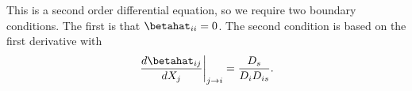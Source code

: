  This is a second order differential equation, so we require two boundary conditions. The first is that $\betahat_ {i i} = 0$. The second condition is based on the first derivative with 
 \begin{equation}
 \left. \frac{d \betahat_{i j}}{d X_j} \right|_{j \rightarrow i} = \frac{D_s}{D_i D_{i s}}.
 \end{equation}
  